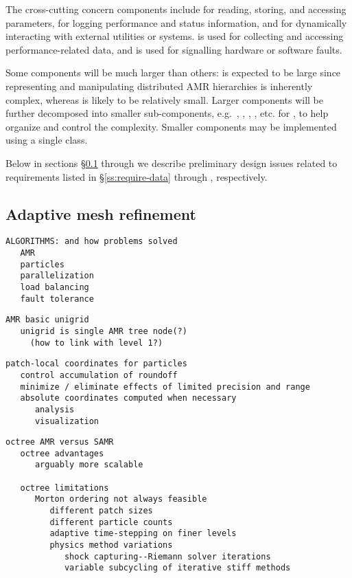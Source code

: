 \documentclass{article}
\begin{document}
The cross-cutting concern components include  for
reading, storing, and accessing parameters,  for logging
performance and status information, and  for dynamically
interacting with external utilities or systems.   is
used for collecting and accessing performance-related data, and
 is used for signalling hardware or software faults.


Some components will be much larger than others:  is
expected to be large since representing and manipulating distributed
AMR hierarchies is inherently complex, whereas  is likely
to be relatively small.  Larger components will be further decomposed
into smaller sub-components, e.g.~, ,
, , etc. for , to help organize and
control the complexity.  Smaller components may be implemented using a
single class.

Below in sections \S\ref{ss:design-data} through \label{ss:design-resilience}
we describe preliminary design issues related to requirements listed in
\S\ref{ss:require-data} through \label{ss:require-resilience}, respectively.

\subsection{Adaptive mesh refinement} \label{ss:design-data}

\begin{verbatim}
ALGORITHMS: and how problems solved
   AMR
   particles
   parallelization
   load balancing
   fault tolerance
\end{verbatim}

\begin{verbatim}
AMR basic unigrid
   unigrid is single AMR tree node(?)
     (how to link with level 1?)
\end{verbatim}

\begin{verbatim}
patch-local coordinates for particles
   control accumulation of roundoff
   minimize / eliminate effects of limited precision and range
   absolute coordinates computed when necessary
      analysis
      visualization
\end{verbatim}

\begin{verbatim}
octree AMR versus SAMR   
   octree advantages
      arguably more scalable

   octree limitations
      Morton ordering not always feasible
         different patch sizes
         different particle counts
         adaptive time-stepping on finer levels
         physics method variations
            shock capturing--Riemann solver iterations
            variable subcycling of iterative stiff methods
\end{verbatim}
\end{document}
